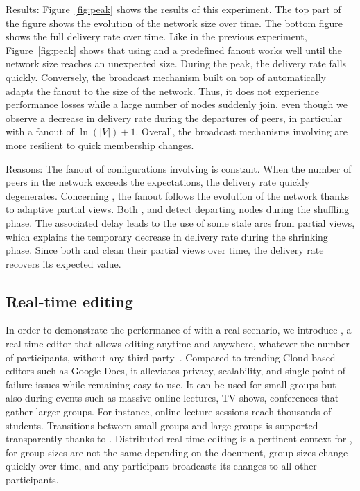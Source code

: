 \begin{asparadesc}
\item [Results:] Figure~\ref{fig:peak} shows the results of this
  experiment. The top part of the figure shows the evolution of the
  network size over time. The bottom figure shows the full delivery
  rate over time. Like in the previous experiment,
  Figure~\ref{fig:peak} shows that using \CYCLON and a predefined
  fanout works well until the network size reaches an unexpected
  size. During the peak, the delivery rate falls quickly. Conversely,
  the broadcast mechanism built on top of \SPRAY automatically adapts
  the fanout to the size of the network. Thus, it does not experience
  performance losses while a large number of nodes suddenly join, even
  though we observe a decrease in delivery rate during the departures
  of peers, in particular with a fanout of $\ln(|V|)+1$. Overall, the
  broadcast mechanisms involving \SPRAY are more resilient to quick
  membership changes.
\item [Reasons:] The fanout of configurations involving \CYCLON is
  constant. When the number of peers in the network exceeds the
  expectations, the delivery rate quickly degenerates. Concerning
  \SPRAY, the fanout follows the evolution of the network thanks to
  adaptive partial views. Both \SPRAY, and \CYCLON detect departing
  nodes during the shuffling phase. The associated delay leads to the
  use of some stale arcs from partial views, which explains the
  temporary decrease in delivery rate during the shrinking
  phase. Since both \CYCLON and \SPRAY clean their partial views over
  time, the delivery rate recovers its expected value.
\end{asparadesc}


\subsection{Real-time editing}
\label{sec:use-case}

In order to demonstrate the performance of \SPRAY with a real scenario, we
introduce \CRATE, a real-time
editor that allows editing anytime and anywhere, whatever the number of
participants, without any third party~\cite{nedelec2016crate}. Compared to
trending Cloud-based editors such as Google Docs, it alleviates privacy,
scalability, and single point of failure issues while remaining easy to use.  It
can be used for small groups but also during events such as massive online
lectures, TV shows, conferences that gather larger groups. For instance, online
lecture sessions reach thousands of students. Transitions between small groups
and large groups is supported transparently thanks to \SPRAY. Distributed
real-time editing is a pertinent context for \SPRAY, for group sizes are not the
same depending on the document, group sizes change quickly over time, and any
participant broadcasts its changes to all other participants.

